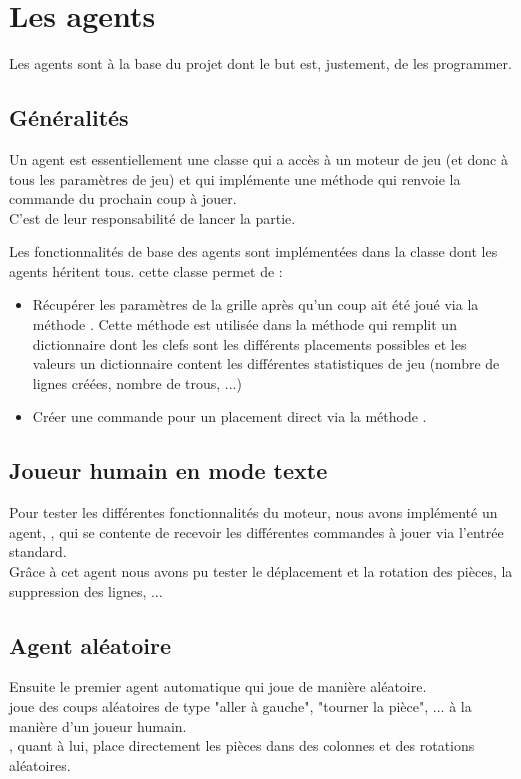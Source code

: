 \chapter{Les agents}
Les agents sont à la base du projet dont le but est, justement, de les programmer.

\section{Généralités}
Un agent est essentiellement une classe qui a accès à un moteur de jeu (et donc à tous les paramètres de jeu) et qui implémente une méthode  qui renvoie la commande du prochain coup à jouer. \\
C'est de leur responsabilité de lancer la partie.

Les fonctionnalités de base des agents sont implémentées dans la classe  dont les agents héritent tous. cette classe permet de :
\begin{itemize}
	\item Récupérer les paramètres de la grille après qu'un coup ait été joué via la méthode . Cette méthode est utilisée dans la méthode  qui remplit un dictionnaire dont les clefs sont les différents placements possibles et les valeurs un dictionnaire content les différentes statistiques de jeu (nombre de lignes créées, nombre de trous, ...)
	\item Créer une commande pour un placement direct via la méthode .
\end{itemize}

\section{Joueur humain en mode texte}
Pour tester les différentes fonctionnalités du moteur, nous avons implémenté un agent, , qui se contente de recevoir les différentes commandes à jouer via l'entrée standard.\\
Grâce à cet agent nous avons pu tester le déplacement et la rotation des pièces, la suppression des lignes, ...

\section{Agent aléatoire}
Ensuite le premier agent automatique qui joue de manière aléatoire. \\
 joue des coups aléatoires de type "aller à gauche", "tourner la pièce", ... à la manière d'un joueur humain.\\
, quant à lui, place directement les pièces dans des colonnes et des rotations aléatoires.\\

